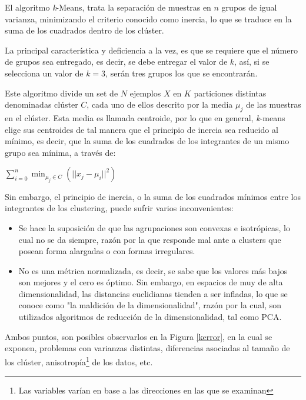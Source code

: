 El algoritmo \textit{k}-Means, trata la separación de muestras en $ n $ grupos de igual varianza, minimizando el criterio conocido como inercia, lo que se traduce en la suma de los cuadrados dentro de los clúster.

La principal característica y deficiencia a la vez, es que se requiere que el número de grupos sea entregado, es decir, se debe entregar el valor de $k$, así, si se selecciona un valor de $k = 3$, serán tres grupos los que se encontrarán. 

Este algoritmo divide un set de $N$ ejemplos $X$ en $K$ particiones distintas denominadas clúster $C$, cada uno de ellos descrito por la media $\mu_{j}$ de las muestras en el clúster. Esta media es llamada centroide, por lo que en general, \textit{k}-means  elige sus centroides de tal manera que el principio de inercia sea reducido al mínimo, es decir, que la suma de los cuadrados de los integrantes de un mismo grupo sea mínima, a través de:

\begin{center}
	$\sum_{i=0}^{n} \min_{\mu_{j} \in C} (|| x_{j}-\mu_{i}||^{2})$
\end{center}

Sin embargo, el principio de inercia, o la suma de los cuadrados mínimos entre los integrantes de los clustering, puede sufrir varios inconvenientes:

\begin{itemize}
	\item Se hace la suposición de que las agrupaciones son convexas e isotrópicas, lo cual no se da siempre, razón por la que responde mal ante a clusters que posean forma alargadas o con formas irregulares.
	
	\item No es una métrica normalizada, es decir, se sabe que los valores más bajos son mejores y el cero es óptimo. Sin embargo, en espacios de muy de alta dimensionalidad, las distancias euclidianas tienden a ser infladas, lo que se conoce como  "la maldición de la dimensionalidad", razón por la cual, son utilizados algoritmos de reducción de la dimensionalidad, tal como PCA.
	
\end{itemize}

Ambos puntos, son posibles observarlos en la Figura  \ref{kerror}, en la cual se exponen, problemas con varianzas distintas, diferencias asociadas al tamaño de los clúster, anisotropía\footnote{Las variables varían en base a las direcciones en las que se examinan} de los datos, etc.

